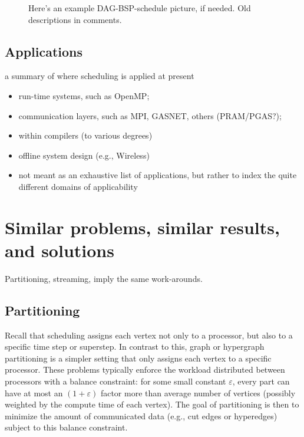 \documentclass[oneside,reqno, a4paper]{amsart}
\numberwithin{equation}{section}
\let\Oldsection\section
\renewcommand{\section}{\FloatBarrier\Oldsection}
\begin{document}
\begin{figure}
	\centering
	\resizebox{0.45\textwidth}{!}{}
	\caption{
		Here's an example DAG-BSP-schedule picture, if needed. Old descriptions in comments.
	}
	\label{fig:BSPexample}
\end{figure}

\subsection{Applications}

a summary of where scheduling is applied at present
\begin{itemize}
	\item run-time systems, such as OpenMP;
	\item communication layers, such as MPI, GASNET, others (PRAM/PGAS?);
	\item within compilers (to various degrees)
	\item offline system design (e.g., Wireless)
	\item not meant as an exhaustive list of applications, but rather to index the quite different domains of applicability
\end{itemize}


\section{Similar problems, similar results, and solutions}

Partitioning,
streaming,
imply the same work-arounds.

\subsection{Partitioning}

Recall that scheduling assigns each vertex not only to a processor, but also to a specific time step or superstep. In contrast to this, graph or hypergraph partitioning is a simpler setting that only assigns each vertex to a specific processor. These problems typically enforce the workload distributed between processors with a balance constraint: for some small constant $\varepsilon$, every part can have at most an $(1+\varepsilon)$ factor more than average number of vertices (possibly weighted by the compute time of each vertex). The goal of partitioning is then to minimize the amount of communicated data (e.g., cut edges or hyperedges) subject to this balance constraint.
\end{document}

